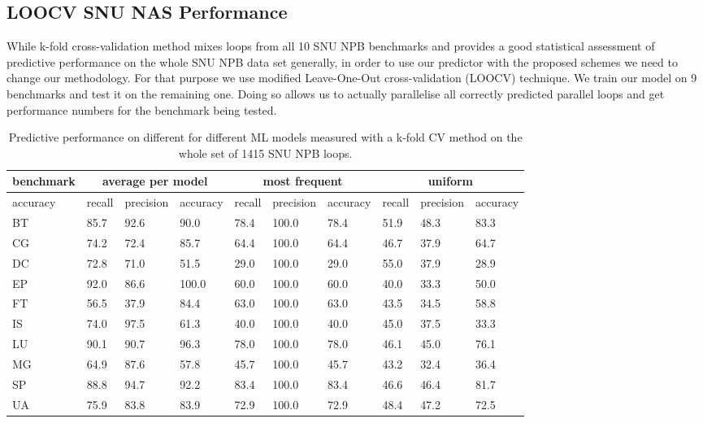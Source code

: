 \documentclass[sigconf,10pt,review,anonymous]{acmart}
\begin{document}
\subsection{LOOCV SNU NAS Performance}
\label{evaluation_loocv}
\quad While k-fold cross-validation method mixes loops from all 10 SNU NPB benchmarks and provides a good statistical assessment of predictive performance on the whole SNU NPB data set generally, in order to use our predictor with the proposed schemes we need to change our methodology. For that purpose we use modified Leave-One-Out cross-validation (LOOCV) technique. We train our model on 9 benchmarks and test it on the remaining one. Doing so allows us to actually parallelise all correctly predicted parallel loops and get performance numbers for the benchmark being tested.

\begin{table}[t!]
    \centering
    \begin{tabular}[c]{|p{1.5cm}|p{1.0cm}|p{1.5cm}|p{1.3cm}|p{1.0cm}|p{1.5cm}|p{1.3cm}|p{1.0cm}|p{1.5cm}|p{1.3cm}|}
        \hline
        benchmark & \multicolumn{3}{c}{average per model} \vline &	\multicolumn{3}{c}{most frequent} \vline & \multicolumn{3}{c}{uniform} \vline \\
        \hline
	    accuracy & recall &	precision &	accuracy & recall &	precision &	accuracy &	recall	& precision & accuracy \\
	    \hline
        BT & 85.7 & 92.6 & 90.0 & 78.4 & 100.0 & 78.4 & 51.9 & 48.3 & 83.3 \\
        \hline
        CG & 74.2 & 72.4 & 85.7	& 64.4 & 100.0 & 64.4 & 46.7 & 37.9 & 64.7 \\
        \hline
        DC & 72.8 & 71.0 & 51.5	& 29.0 & 100.0 & 29.0 & 55.0 & 37.9 & 28.9 \\
        \hline
        EP & 92.0 &	86.6 & 100.0 & 60.0 & 100.0 & 60.0 & 40.0 & 33.3 & 50.0 \\
        \hline
        FT & 56.5 &	37.9 & 84.4	& 63.0 & 100.0 & 63.0 & 43.5 & 34.5	& 58.8 \\
        \hline
        IS & 74.0 &	97.5 & 61.3	& 40.0 & 100.0 & 40.0 &	45.0 & 37.5	& 33.3 \\
        \hline
        LU & 90.1 &	90.7 & 96.3	& 78.0 & 100.0 & 78.0 & 46.1 & 45.0	& 76.1 \\
        \hline
        MG & 64.9 &	87.6 & 57.8	& 45.7 & 100.0 & 45.7 &	43.2 & 32.4	& 36.4 \\
        \hline
        SP & 88.8 &	94.7 & 92.2	& 83.4 & 100.0 & 83.4 &	46.6 & 46.4	& 81.7 \\
        \hline
        UA & 75.9 &	83.8 & 83.9	& 72.9 & 100.0 & 72.9 &	48.4 & 47.2	& 72.5 \\
        \hline
    \end{tabular}
    \caption{Predictive performance on different for different ML models measured with a k-fold CV method on the whole set of 1415 SNU NPB loops.}
    \label{tab:average_accuracy}
\end{table}
\end{document}
